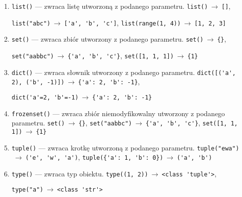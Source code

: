 
\begin{enumerate}[]
    \item \verb|list()| --- zwraca listę utworzoną z podanego parametru. \verb|list()|$\ \to\ $\verb|[]|,

    \verb|list("abc")|$\ \to\ $\verb|['a', 'b', 'c']|, \verb|list(range(1, 4))|$\ \to\ $\verb|[1, 2, 3]|

    \item \verb|set()| --- zwraca zbiór utworzony z podanego parametru. \verb|set()|$\ \to\ $\verb|{}|,

    \verb|set("aabbc")|$\ \to\ $\verb|{'a', 'b', 'c'}|, \verb|set([1, 1, 1])|$\ \to\ $\verb|{1}|

    \item \verb|dict()| --- zwraca słownik utworzony z podanego parametru. \verb|dict([('a', 2), ('b', -1)])|$\ \to\ $\verb|{'a': 2, 'b': -1}|,

    \verb|dict('a'=2, 'b'=-1)|$\ \to\ $\verb|{'a': 2, 'b': -1}|

    \item \verb|frozenset()| --- zwraca zbiór niemodyfikowalny utworzony z podanego parametru. \verb|set()|$\ \to\ $\verb|{}|, \verb|set("aabbc")|$\ \to\ $\verb|{'a', 'b', 'c'}|, \verb|set([1, 1, 1])|$\ \to\ $\verb|{1}|

    \item \verb|tuple()| --- zwraca krotkę utworzoną z podanego parametru. \verb|tuple("ewa")|$\ \to\ $\verb|('e', 'w', 'a')|, \verb|tuple({'a': 1, 'b': 0})|$\ \to\ $\verb|('a', 'b')|

    \item \verb|type()| --- zwraca typ obiektu. \verb|type((1, 2))|$\ \to\ $\verb|<class 'tuple'>|,

    \verb|type("a")|$\ \to\ $\verb|<class 'str'>|

\end{enumerate}












